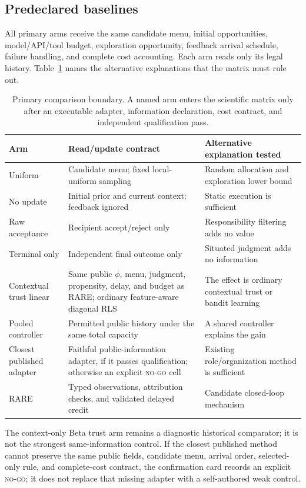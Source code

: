 \documentclass[sigconf,anonymous]{aamas}
\begin{document}
\subsection{Predeclared baselines}
All primary arms receive the same candidate menu, initial opportunities, model/API/tool budget, exploration opportunity, feedback arrival schedule, failure handling, and complete cost accounting. Each arm reads only its legal history. Table~\ref{tab:baselines} names the alternative explanations that the matrix must rule out.
\begin{table}[t]
\centering\small
\begin{tabular}{p{}p{}p{}}
\toprule
Arm & Read/update contract & Alternative explanation tested\\
\midrule
Uniform & Candidate menu; fixed local-uniform sampling & Random allocation and exploration lower bound\\
No update & Initial prior and current context; feedback ignored & Static execution is sufficient\\
Raw acceptance & Recipient accept/reject only & Responsibility filtering adds no value\\
Terminal only & Independent final outcome only & Situated judgment adds no information\\
Contextual trust linear & Same public $\phi$, menu, judgment, propensity, delay, and budget as RARE; ordinary feature-aware diagonal RLS & The effect is ordinary contextual trust or bandit learning\\
Pooled controller & Permitted public history under the same total capacity & A shared controller explains the gain\\
Closest published adapter & Faithful public-information adapter, if it passes qualification; otherwise an explicit \textsc{no-go} cell & Existing role/organization method is sufficient\\
RARE & Typed observations, attribution checks, and validated delayed credit & Candidate closed-loop mechanism\\
\bottomrule
\end{tabular}
\caption{Primary comparison boundary. A named arm enters the scientific matrix only after an executable adapter, information declaration, cost contract, and independent qualification pass.}
\label{tab:baselines}
\end{table}

The context-only Beta trust arm remains a diagnostic historical comparator; it is not the
strongest same-information control. If the closest published method cannot preserve the same public fields, candidate menu,
arrival order, selected-only rule, and complete-cost contract, the confirmation card records
an explicit \textsc{no-go}; it does not replace that missing adapter with a self-authored
weak control.
\end{document}
